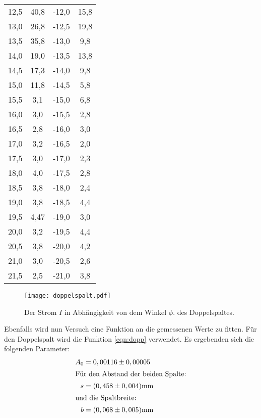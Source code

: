 \begin{table}
\begin{tabular}{c c c c}
    12,5 & 40,8  & -12,0 & 15,8 \\
    13,0 & 26,8  & -12,5 & 19,8 \\
    13,5 & 35,8  & -13,0 & 9,8 \\
    14,0 & 19,0  & -13,5 & 13,8 \\
    14,5 & 17,3  & -14,0 & 9,8  \\
    15,0 & 11,8  & -14,5 & 5,8  \\
    15,5 & 3,1   & -15,0 & 6,8  \\
    16,0 & 3,0   & -15,5 & 2,8  \\
    16,5 & 2,8   & -16,0 & 3,0  \\
    17,0 & 3,2   & -16,5 & 2,0  \\
    17,5 & 3,0   & -17,0 & 2,3  \\
    18,0 & 4,0   & -17,5 & 2,8  \\
    18,5 & 3,8   & -18,0 & 2,4  \\
    19,0 & 3,8   & -18,5 & 4,4  \\
    19,5 & 4,47  & -19,0 & 3,0  \\
    20,0 & 3,2   & -19,5 & 4,4  \\
    20,5 & 3,8   & -20,0 & 4,2  \\
    21,0 & 3,0   & -20,5 & 2,6  \\
    21,5 & 2,5   & -21,0 & 3,8  \\
    \bottomrule
    \end{tabular}
\end{table}
\FloatBarrier
\begin{figure}
  \centering
  \texttt{[image: doppelspalt.pdf]}
  \caption{ Der Strom $I$ in Abhängigkeit von dem Winkel $\phi$. des Doppelspaltes.}
  \label{fig:dopp}
\end{figure}
\FloatBarrier
Ebenfalls wird nun Versuch eine Funktion an die gemessenen Werte zu fitten.
Für den Doppelspalt wird die Funktion \eqref{eqn:dopp} verwendet.
Es ergebenden sich die folgenden
Parameter:
\begin{align*}
  A_0&=0,00116\pm0,00005\\
  \intertext{Für den Abstand der beiden Spalte:}
    s&=(0,458\pm0,004)\si{\milli\meter}\\
  \intertext{und die Spaltbreite:}
    b&=(0,068\pm0,005)\si{\milli\meter}\\
\end{align*}
